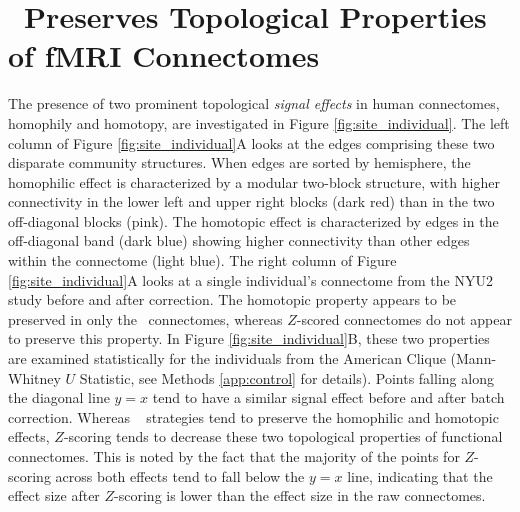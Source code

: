 {\section{\Combat\ Preserves Topological Properties of fMRI Connectomes}
\label{app:topological}
The presence of two prominent topological \textit{signal effects} in human connectomes, homophily  and homotopy, are investigated in Figure \ref{fig:site_individual}. 
The left column of Figure \ref{fig:site_individual}A looks at the edges comprising these two disparate community structures. When edges are sorted by hemisphere, the homophilic effect is characterized by a modular two-block structure, with higher connectivity in the lower left and upper right blocks (dark red) than in the two off-diagonal blocks (pink). The homotopic effect is characterized by edges in the off-diagonal band (dark blue) showing higher connectivity than other edges within the connectome (light blue). The right column of Figure \ref{fig:site_individual}A looks at a single individual's connectome from the NYU2 study before and after correction. The homotopic property appears to be  preserved in only the \Combat\ connectomes, whereas $Z$-scored connectomes do not appear to preserve this property. In Figure \ref{fig:site_individual}B, these two properties are examined statistically for the individuals from the American Clique (Mann-Whitney $U$ Statistic, see Methods \ref{app:control} for details). Points falling along the diagonal line $y=x$ tend to have a similar signal effect before and after batch correction. Whereas \Combat~ strategies tend to preserve the homophilic and homotopic effects, $Z$-scoring tends to decrease these two topological properties of functional connectomes. This is noted by the fact that the majority of the points for $Z$-scoring across both effects tend to fall below the $y=x$ line, indicating that the effect size after $Z$-scoring is lower than the effect size in the raw connectomes.


}
